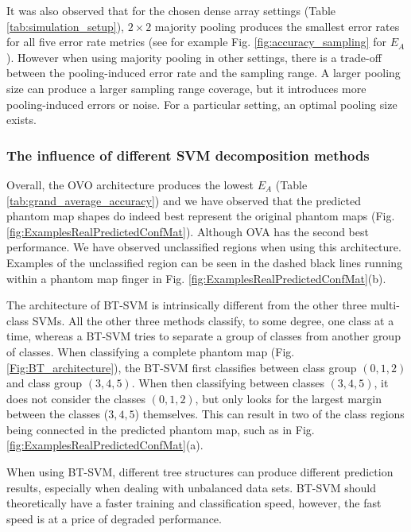 It was also observed that for the chosen dense array settings (Table \ref{tab:simulation_setup}), $2 \times 2$ majority pooling produces the smallest error rates for all five error rate metrics (see for example Fig. \ref{fig:accuracy_sampling} for $E_A$). However when using majority pooling in other settings, there is a trade-off between the pooling-induced error rate and the sampling range. A larger pooling size can produce a larger sampling range coverage, but it introduces more pooling-induced errors or noise. For a particular setting, an optimal pooling size exists.



\subsubsection{The influence of different SVM decomposition methods}
Overall, the OVO architecture produces the lowest $E_A$ (Table \ref{tab:grand_average_accuracy}) and we have observed that the predicted phantom map shapes do indeed best represent the original phantom maps (Fig. \ref{fig:ExamplesRealPredictedConfMat}). Although OVA has the second best performance. We have observed unclassified regions when using this architecture. Examples of the unclassified region can be seen in the dashed black lines running within a phantom map finger in Fig. \ref{fig:ExamplesRealPredictedConfMat}(b).

The architecture of BT-SVM is intrinsically different from the other three multi-class SVMs. All the other three methods classify, to some degree, one class at a time, whereas a BT-SVM tries to separate a group of classes from another group of classes. 
When classifying a complete phantom map (Fig. \ref{Fig:BT_architecture}), the BT-SVM first classifies between class group $(0,1,2)$ and class group $(3,4,5)$. When then classifying between classes $(3, 4, 5)$, it does not consider the classes $(0,1,2)$, but only looks for the largest margin between the classes ($3,4,5$) themselves. This can result in two of the class regions being connected in the predicted phantom map, such as in Fig. \ref{fig:ExamplesRealPredictedConfMat}(a).

When using BT-SVM, different tree structures can produce different prediction results, especially when dealing with unbalanced data sets.
BT-SVM should theoretically have a faster training and classification speed, however, the fast speed is at a price of degraded performance\cite{cheong2004support}.



